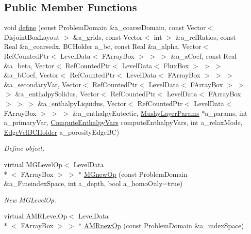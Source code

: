\subsection*{Public Member Functions}
\begin{DoxyCompactItemize}
\item 
void \hyperlink{class_a_m_r_non_linear_v_c_op_factory_a352c77b9221ade7aeee043c7eb958631}{define} (const Problem\-Domain \&a\-\_\-coarse\-Domain, const Vector$<$ Disjoint\-Box\-Layout $>$ \&a\-\_\-grids, const Vector$<$ int $>$ \&a\-\_\-ref\-Ratios, const Real \&a\-\_\-coarsedx, B\-C\-Holder a\-\_\-bc, const Real \&a\-\_\-alpha, Vector$<$ Ref\-Counted\-Ptr$<$ Level\-Data$<$ F\-Array\-Box $>$ $>$ $>$ \&a\-\_\-a\-Coef, const Real \&a\-\_\-beta, Vector$<$ Ref\-Counted\-Ptr$<$ Level\-Data$<$ Flux\-Box $>$ $>$ $>$ \&a\-\_\-b\-Coef, Vector$<$ Ref\-Counted\-Ptr$<$ Level\-Data$<$ F\-Array\-Box $>$ $>$ $>$ \&a\-\_\-secondary\-Var, Vector$<$ Ref\-Counted\-Ptr$<$ Level\-Data$<$ F\-Array\-Box $>$ $>$ $>$ \&a\-\_\-enthalpy\-Solidus, Vector$<$ Ref\-Counted\-Ptr$<$ Level\-Data$<$ F\-Array\-Box $>$ $>$ $>$ \&a\-\_\-enthalpy\-Liquidus, Vector$<$ Ref\-Counted\-Ptr$<$ Level\-Data$<$ F\-Array\-Box $>$ $>$ $>$ \&a\-\_\-enthalpy\-Eutectic, \hyperlink{class_mushy_layer_params}{Mushy\-Layer\-Params} $\ast$a\-\_\-params, int a\-\_\-primary\-Var, \hyperlink{class_compute_enthalpy_vars}{Compute\-Enthalpy\-Vars} compute\-Enthalpy\-Vars, int a\-\_\-relax\-Mode, \hyperlink{class_edge_vel_b_c_holder}{Edge\-Vel\-B\-C\-Holder} a\-\_\-porosity\-Edge\-B\-C)
\begin{DoxyCompactList}\small\item\em Define object. \end{DoxyCompactList}\item 
\hypertarget{class_a_m_r_non_linear_v_c_op_factory_acdba2049517cd77799bc4be71fd17b98}{virtual M\-G\-Level\-Op$<$ Level\-Data\\*
$<$ F\-Array\-Box $>$ $>$ $\ast$ \hyperlink{class_a_m_r_non_linear_v_c_op_factory_acdba2049517cd77799bc4be71fd17b98}{M\-Gnew\-Op} (const Problem\-Domain \&a\-\_\-\-Fineindex\-Space, int a\-\_\-depth, bool a\-\_\-homo\-Only=true)}\label{class_a_m_r_non_linear_v_c_op_factory_acdba2049517cd77799bc4be71fd17b98}

\begin{DoxyCompactList}\small\item\em New M\-G\-Level\-Op. \end{DoxyCompactList}\item 
\hypertarget{class_a_m_r_non_linear_v_c_op_factory_a3b35d8d33bed1159477f133f57302bfc}{virtual A\-M\-R\-Level\-Op$<$ Level\-Data\\*
$<$ F\-Array\-Box $>$ $>$ $\ast$ \hyperlink{class_a_m_r_non_linear_v_c_op_factory_a3b35d8d33bed1159477f133f57302bfc}{A\-M\-Rnew\-Op} (const Problem\-Domain \&a\-\_\-index\-Space)}\label{class_a_m_r_non_linear_v_c_op_factory_a3b35d8d33bed1159477f133f57302bfc}


\end{DoxyCompactItemize}
